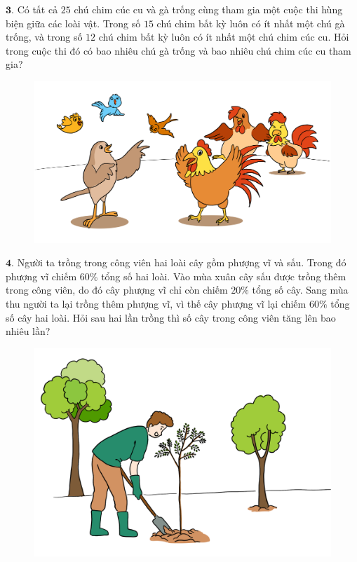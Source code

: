 \begin{multicols}{2}
\begin{figure}[H]
		\vspace*{-5pt}
	\end{figure}
	$\pmb{3.}$ 	Có tất cả $25$ chú chim cúc cu và gà trống cùng tham gia một cuộc thi hùng biện giữa các loài vật. Trong số $15$ chú chim bất kỳ luôn có ít nhất một chú gà trống, và trong số $12$ chú chim bất kỳ luôn có ít nhất một chú chim cúc cu. Hỏi trong cuộc thi đó có bao nhiêu chú gà trống và bao nhiêu chú chim cúc cu tham gia?
	\begin{figure}[H]
		\centering
		\vspace*{-5pt}
		\captionsetup{labelformat= empty, justification=centering}
		\includegraphics[width=1\linewidth]{Pi6_bai3}
		\vspace*{-10pt}
	\end{figure}
	$\pmb{4.}$ Người ta trồng trong công viên hai loài cây gồm phượng vĩ và sấu. Trong đó phượng vĩ chiếm $60\%$ tổng số hai loài. Vào mùa xuân cây sấu được trồng thêm trong công viên, do đó cây phượng vĩ chỉ còn chiếm $20\%$ tổng số cây. Sang mùa thu người ta lại trồng thêm  phượng vĩ, vì thế cây phượng vĩ lại chiếm $60\%$ tổng số cây hai loài. Hỏi sau hai lần trồng thì số cây trong công viên tăng lên bao nhiêu lần?
	\begin{figure}[H]
		\centering
		\vspace*{-5pt}
		\captionsetup{labelformat= empty, justification=centering}
		\includegraphics[width=1\linewidth]{Pi6_bai4}

\end{figure}
\end{multicols}
